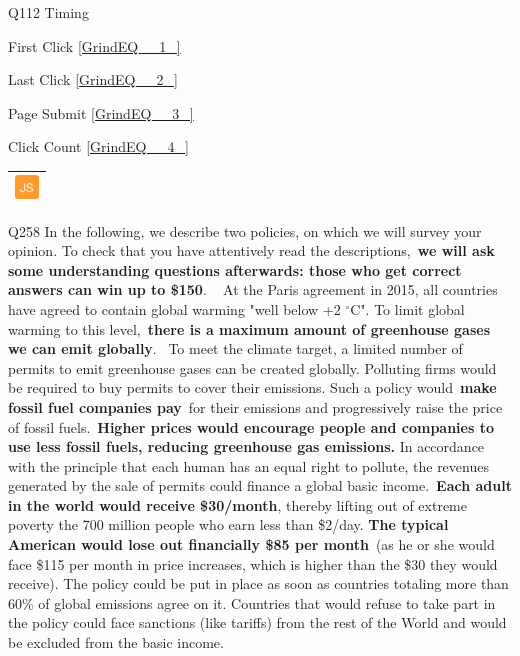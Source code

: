 \documentclass{article} %
\begin{document}
\noindent 

\noindent Q112 Timing

\noindent First Click  \eqref{GrindEQ__1_}

\noindent Last Click  \eqref{GrindEQ__2_}

\noindent Page Submit  \eqref{GrindEQ__3_}

\noindent Click Count  \eqref{GrindEQ__4_}

\noindent 

\noindent 

\begin{tabular}{|p{0.2in}|} \hline 
\includegraphics*[width=0.25in, height=0.25in]{image4} \\ \hline 
\end{tabular}



\noindent Q258 In the following, we describe two policies, on which we will survey your opinion. To check that you have attentively read the descriptions,~\textbf{we will ask some understanding questions afterwards: those who get correct answers can win up to \$150}.  \textbf{}~ At the Paris agreement in 2015, all countries have agreed to contain global warming "well below +2 $\mathrm{{}^\circ}$C". To limit global warming to this level,~\textbf{there is a maximum amount of greenhouse gases we can emit globally}.~ To meet the climate target, a limited number of permits to emit greenhouse gases can be created globally. Polluting firms would be required to buy permits to cover their emissions. Such a policy would~\textbf{make fossil fuel companies pay}~for their emissions and progressively raise the price of fossil fuels.~\textbf{Higher prices would encourage people and companies to use less fossil fuels, reducing greenhouse gas emissions.} In accordance with the principle that each human has an equal right to pollute, the revenues generated by the sale of permits could finance a global basic income.~\textbf{Each adult in the world would receive \$30/month}, thereby lifting out of extreme poverty the 700 million people who earn less than \$2/day. \textbf{The typical American would lose out financially \$85 per month}~(as he or she would face \$115 per month in price increases, which is higher than the \$30 they would receive). The policy could be put in place as soon as countries totaling more than 60\% of global emissions agree on it. Countries that would refuse to take part in the policy could face sanctions (like tariffs) from the rest of the World and would be excluded from the basic income.~ ~
\end{document}
